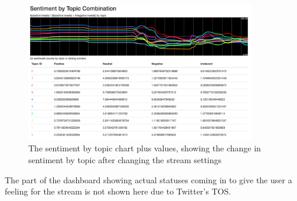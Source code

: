 \begin{figure}
    \centering
    \caption{The sentiment by topic chart plus values, showing the change in sentiment by topic after changing the stream settings}
    \label{fig:dashboard-sentiment-by-topic}
    \includegraphics[width=10cm]{../images/dashboard_sentiment_by_topic.png}
\end{figure}

\par
The part of the dashboard showing actual statuses coming in to give the user a feeling for the stream is not shown here due to Twitter's TOS.